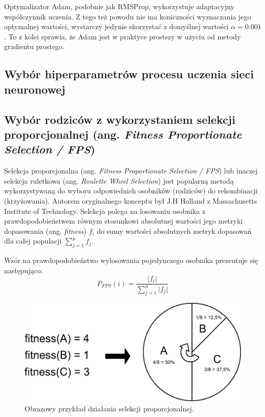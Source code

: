 \documentclass[a4paper,11pt]{article}
\begin{document}
    \bigskip

    Optymalizator Adam, podobnie jak RMSProp, wykorzystuje adaptacyjny współczynnik uczenia. Z tego też powodu nie ma koniczności wyznaczania jego optymalnej wartości, wystarczy jedynie skorzystać z domyślnej wartości $\alpha = 0.001$\cite{UczenieMaszynowe2018}. To z kolei sprawia, że Adam jest w praktyce prostszy w użyciu od metody gradientu prostego.

    \subsection{Wybór hiperparametrów procesu uczenia sieci neuronowej}

    \subsection{Wybór rodziców z wykorzystaniem selekcji proporcjonalnej (ang. \textit{Fitness Proportionate Selection / FPS})}

    Selekcja proporcjonalna (ang. \textit{Fitness Proportionate Selection / FPS}) lub inaczej selekcja ruletkowa (ang. \textit{Roulette Wheel Selection}) jest popularną metodą wykorzystywaną do wyboru odpowiednich osobników (rodziców) do rekombinacji (krzyżowania). Autorem oryginalnego konceptu był J.H Holland z Massachusetts Institute of Technology. Selekcja polega na losowaniu osobnika z prawdopodobieństwem równym stosunkowi absolutnej wartości jego metryki dopasowania (ang. \textit{fitness}) $f_{i}$ do sumy wartości absolutnych metryk dopasowań dla całej populacji $\sum_{j=1}^{\mu} f_{j}$\cite{IntroductionToEvolutionaryComputing2015}.

    \bigskip

    Wzór na prawdopodobieństwo wylosowania pojedynczego osobnika prezentuje się następująco: \\
    \begin{equation}
        \label{equ:fitness_proportionate_selection}
        P_{FPS}(i) = \frac{\lvert f_{i} \rvert}{\sum_{j=1}^{\mu} \lvert f_{j} \rvert}
    \end{equation}

    \bigskip

    \begin{figure}[H]
        \label{fig:proportional_selection}
        \centering
        \includegraphics[width=\textwidth]{proportional_selection}
        \caption{Obrazowy przykład działania selekcji proporcjonalnej.}
    \end{figure}
\end{document}
